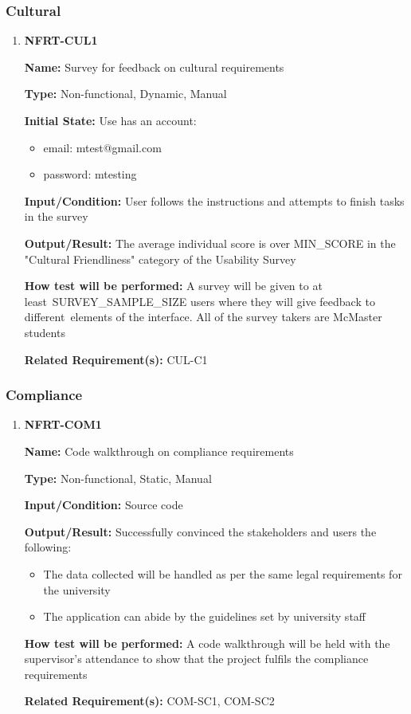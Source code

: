\documentclass[12pt, titlepage]{article}
\begin{document}
\subsubsection{Cultural}
\begin{enumerate}
\item{\textbf{NFRT-CUL1}}

\textbf{Name:} Survey for feedback on cultural requirements

\textbf{Type:} Non-functional, Dynamic, Manual

\textbf{Initial State:} Use has an account:
\begin{itemize}
\item email: mtest@gmail.com
\item password: mtesting
\end{itemize}

\textbf{Input/Condition:} User follows the instructions and attempts to finish tasks in the survey

\textbf{Output/Result:} The average individual score is over MIN\_SCORE in the "Cultural Friendliness" category of the Usability Survey

\textbf{How test will be performed:} A survey will be given to at least\
SURVEY\_SAMPLE\_SIZE users where they will give feedback to different\
elements of the interface. All of the survey takers are McMaster students

\textbf{Related Requirement(s):} CUL-C1
\end{enumerate}

\subsubsection{Compliance}
\begin{enumerate}
\item{\textbf{NFRT-COM1}}

\textbf{Name:} Code walkthrough on compliance requirements

\textbf{Type:} Non-functional, Static, Manual

\textbf{Input/Condition:} Source code

\textbf{Output/Result:} Successfully convinced the stakeholders and users the following:
\begin{itemize}
\item The data collected will be handled as per the same legal requirements for the university
\item The application can abide by the guidelines set by university staff
\end{itemize}

\textbf{How test will be performed:} A code walkthrough will be held with the supervisor's attendance to show that the project fulfils the compliance requirements

\textbf{Related Requirement(s):} COM-SC1, COM-SC2
\end{enumerate}
\end{document}
